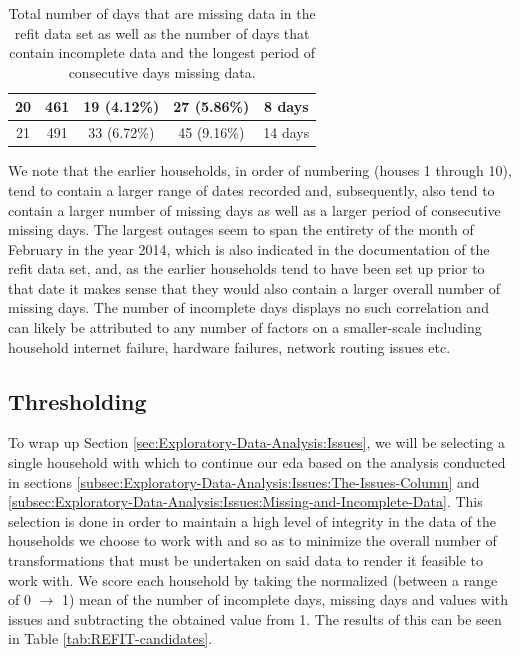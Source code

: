 \begin{table}[H]
\begin{adjustwidth}{-3.0cm}{-3.0cm}
\begin{tabular}{ccccc}
                        20                        & 461                         & 19 (4.12\%)                  & 27 (5.86\%)                     & 8 days                  \\ \midrule
                        21                        & 491                         & 33 (6.72\%)                  & 45 (9.16\%)                     & 14 days                 \\ \bottomrule
                \end{tabular}
                \caption{Total number of days that are missing data in the \gls{refit} data set as well as the number of days that contain incomplete data and the longest period of consecutive days missing data.}
                \label{tab:REFIT-missing-data}
        \end{adjustwidth}
\end{table}

\noindent \newline We note that the earlier households, in order of numbering (houses 1 through 10), tend to contain a larger range of dates recorded and, subsequently, also tend to contain a larger number of missing days as well as a larger period of consecutive missing days. The largest outages seem to span the entirety of the month of February in the year 2014, which is also indicated in the documentation of the \gls{refit} data set, and, as the earlier households tend to have been set up prior to that date it makes sense that they would also contain a larger overall number of missing days. The number of incomplete days displays no such correlation and can likely be attributed to any number of factors on a smaller-scale including household internet failure, hardware failures, network routing issues etc.

\subsection{Thresholding}
\label{subsec:Exploratory-Data-Analysis:Issues:Thresholding}
To wrap up Section \ref{sec:Exploratory-Data-Analysis:Issues}, we will be selecting a single household with which to continue our \gls{eda} based on the analysis conducted in sections \ref{subsec:Exploratory-Data-Analysis:Issues:The-Issues-Column} and \ref{subsec:Exploratory-Data-Analysis:Issues:Missing-and-Incomplete-Data}. This selection is done in order to maintain a high level of integrity in the data of the households we choose to work with and so as to minimize the overall number of transformations that must be undertaken on said data to render it feasible to work with. We score each household by taking the normalized (between a range of 0 $\rightarrow$ 1) mean of the number of incomplete days, missing days and values with issues and subtracting the obtained value from 1. The results of this can be seen in Table \ref{tab:REFIT-candidates}.


